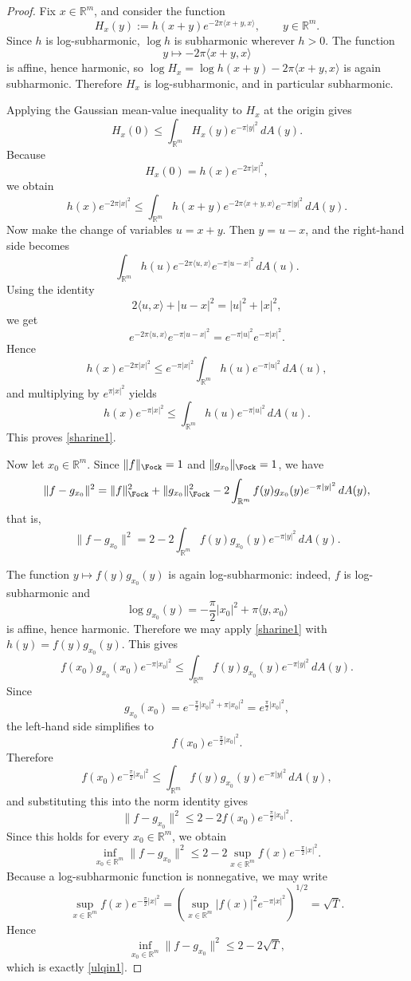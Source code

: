 \begin{proof}
Fix \(x\in \mathbb{R}^m\), and consider the function
\[
H_x(y):=h(x+y)e^{-2\pi \langle x+y,x\rangle}, \qquad y\in \mathbb{R}^m.
\]
Since \(h\) is log-subharmonic, \(\log h\) is subharmonic wherever \(h>0\). The function
\[
y\mapsto -2\pi \langle x+y,x\rangle
\]
is affine, hence harmonic, so \(\log H_x=\log h(x+y)-2\pi\langle x+y,x\rangle\) is again subharmonic. Therefore \(H_x\) is log-subharmonic, and in particular subharmonic.

Applying the Gaussian mean-value inequality to \(H_x\) at the origin gives
\[
H_x(0)\le \int_{\mathbb{R}^m} H_x(y)e^{-\pi |y|^2}\,dA(y).
\]
Because
\[
H_x(0)=h(x)e^{-2\pi |x|^2},
\]
we obtain
\[
h(x)e^{-2\pi |x|^2}
\le
\int_{\mathbb{R}^m} h(x+y)e^{-2\pi\langle x+y,x\rangle}e^{-\pi|y|^2}\,dA(y).
\]
Now make the change of variables \(u=x+y\). Then \(y=u-x\), and the right-hand side becomes
\[
\int_{\mathbb{R}^m} h(u)e^{-2\pi\langle u,x\rangle}e^{-\pi|u-x|^2}\,dA(u).
\]
Using the identity
\[
2\langle u,x\rangle+|u-x|^2=|u|^2+|x|^2,
\]
we get
\[
e^{-2\pi\langle u,x\rangle}e^{-\pi|u-x|^2}
=
e^{-\pi|u|^2}e^{-\pi|x|^2}.
\]
Hence
\[
h(x)e^{-2\pi |x|^2}
\le
e^{-\pi|x|^2}\int_{\mathbb{R}^m} h(u)e^{-\pi|u|^2}\,dA(u),
\]
and multiplying by \(e^{\pi|x|^2}\) yields
\[
h(x)e^{-\pi |x|^2}\le  \int_{\mathbb{R}^m} h(u)e^{-\pi |u|^2}\,dA(u).
\]
This proves \eqref{sharine1}.

Now let \(x_0\in \mathbb{R}^m\). Since \(\|f\|_{\Fock}=1\) and \(\|g_{x_0}\|_{\Fock}=1\), we have
\[
\|f-g_{x_0}\|^2
=
\|f\|_{\Fock}^2+\|g_{x_0}\|_{\Fock}^2
-2\int_{\mathbb{R}^m} f(y)g_{x_0}(y)e^{-\pi|y|^2}\,dA(y),
\]
that is,
\[
\|f-g_{x_0}\|^2
=
2-2\int_{\mathbb{R}^m} f(y)g_{x_0}(y)e^{-\pi|y|^2}\,dA(y).
\]

The function \(y\mapsto f(y)g_{x_0}(y)\) is again log-subharmonic: indeed, \(f\) is log-subharmonic and
\[
\log g_{x_0}(y)= -\frac{\pi}{2}|x_0|^2+\pi\langle y,x_0\rangle
\]
is affine, hence harmonic. Therefore we may apply \eqref{sharine1} with \(h(y)=f(y)g_{x_0}(y)\). This gives
\[
f(x_0)g_{x_0}(x_0)e^{-\pi|x_0|^2}
\le
\int_{\mathbb{R}^m} f(y)g_{x_0}(y)e^{-\pi|y|^2}\,dA(y).
\]
Since
\[
g_{x_0}(x_0)
=
e^{-\frac{\pi}{2}|x_0|^2+\pi|x_0|^2}
=
e^{\frac{\pi}{2}|x_0|^2},
\]
the left-hand side simplifies to
\[
f(x_0)e^{-\frac{\pi}{2}|x_0|^2}.
\]
Therefore
\[
f(x_0)e^{-\frac{\pi}{2}|x_0|^2}
\le
\int_{\mathbb{R}^m} f(y)g_{x_0}(y)e^{-\pi|y|^2}\,dA(y),
\]
and substituting this into the norm identity gives
\[
\|f-g_{x_0}\|^2
\le
2-2f(x_0)e^{-\frac{\pi}{2}|x_0|^2}.
\]
Since this holds for every \(x_0\in\mathbb{R}^m\), we obtain
\[
\inf_{x_0\in\mathbb{R}^m}\|f-g_{x_0}\|^2
\le
2-2\sup_{x\in\mathbb{R}^m} f(x)e^{-\frac{\pi}{2}|x|^2}.
\]
Because a log-subharmonic function is nonnegative, we may write
\[
\sup_{x\in\mathbb{R}^m} f(x)e^{-\frac{\pi}{2}|x|^2}
=
\left(\sup_{x\in\mathbb{R}^m}|f(x)|^2e^{-\pi|x|^2}\right)^{1/2}
=
\sqrt{T}.
\]
Hence
\[
\inf_{x_0\in\mathbb{R}^m}\|f-g_{x_0}\|^2\le 2-2\sqrt{T},
\]
which is exactly \eqref{ulqin1}.
\end{proof}
